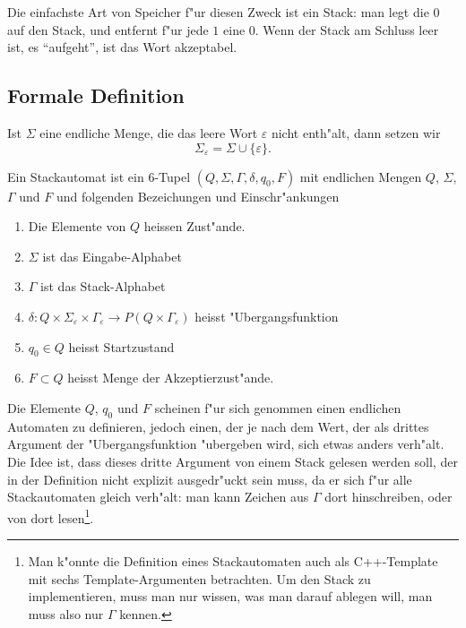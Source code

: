 Die einfachste Art von Speicher f"ur diesen Zweck ist ein Stack:
man legt die $0$ auf den Stack, und entfernt f"ur jede $1$ eine 
$0$. Wenn der Stack am Schluss leer ist, es ``aufgeht'', ist das
Wort akzeptabel.

\subsection{Formale Definition}
\begin{definition}
Ist $\Sigma$ eine endliche Menge, die das leere Wort $\varepsilon$
nicht enth"alt, dann setzen wir 
\[
\Sigma_\varepsilon = \Sigma\cup \{\varepsilon\}.
\]
\end{definition}

\begin{definition}
Ein Stackautomat ist ein $6$-Tupel $(Q,\Sigma,\Gamma,\delta,q_0,F)$
mit endlichen Mengen $Q$, $\Sigma$, $\Gamma$ und $F$ und folgenden
Bezeichungen und Einschr"ankungen
\begin{enumerate}
\item Die Elemente von $Q$ heissen Zust"ande.
\item $\Sigma$ ist das Eingabe-Alphabet
\item $\Gamma$ ist das Stack-Alphabet
\item $\delta\colon Q\times \Sigma_\varepsilon\times\Gamma_\varepsilon
\to P(Q\times\Gamma_\varepsilon)$ heisst "Ubergangsfunktion
\item $q_0\in Q$ heisst Startzustand
\item $F\subset Q$ heisst Menge der Akzeptierzust"ande.
\end{enumerate}
\end{definition}
Die Elemente $Q$, $q_0$ und $F$ scheinen f"ur sich genommen
einen endlichen Automaten zu definieren, jedoch einen, der je nach
dem Wert, der als drittes Argument der "Ubergangsfunktion
"ubergeben wird, sich etwas anders verh"alt. Die Idee ist, dass
dieses dritte Argument von einem Stack gelesen werden soll, der in
der Definition nicht explizit ausgedr"uckt sein muss, da er
sich f"ur alle Stackautomaten gleich verh"alt: man kann Zeichen
aus $\Gamma$ dort hinschreiben, oder von dort lesen\footnote{Man k"onnte
die Definition eines Stackautomaten auch als C++-Template mit
sechs Template-Argumenten betrachten. Um den Stack zu
implementieren, muss man nur wissen, was man darauf ablegen will,
man muss also nur $\Gamma$ kennen.}.

